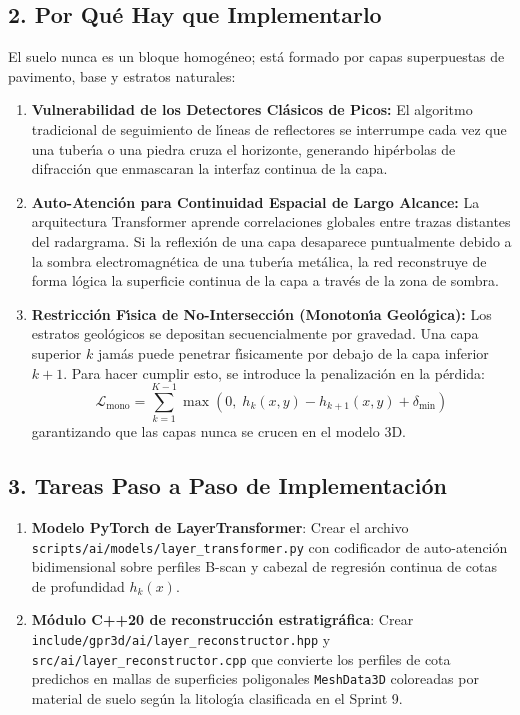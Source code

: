 \documentclass[11pt,a4paper]{article}
\begin{document}
\subsection{2. Por Qu{\'e} Hay que Implementarlo}
El suelo nunca es un bloque homog{\'e}neo; est{\'a} formado por capas superpuestas de pavimento, base y estratos naturales:
\begin{enumerate}
    \item \textbf{Vulnerabilidad de los Detectores Cl{\'a}sicos de Picos:} El algoritmo tradicional de seguimiento de l{\'\i}neas de reflectores se interrumpe cada vez que una tuber{\'\i}a o una piedra cruza el horizonte, generando hip{\'e}rbolas de difracci{\'o}n que enmascaran la interfaz continua de la capa.
    \item \textbf{Auto-Atenci{\'o}n para Continuidad Espacial de Largo Alcance:} La arquitectura Transformer aprende correlaciones globales entre trazas distantes del radargrama. Si la reflexi{\'o}n de una capa desaparece puntualmente debido a la sombra electromagn{\'e}tica de una tuber{\'\i}a met{\'a}lica, la red reconstruye de forma l{\'o}gica la superficie continua de la capa a trav{\'e}s de la zona de sombra.
    \item \textbf{Restricci{\'o}n F{\'\i}sica de No-Intersecci{\'o}n (Monoton{\'\i}a Geol{\'o}gica):} Los estratos geol{\'o}gicos se depositan secuencialmente por gravedad. Una capa superior $k$ jam{\'a}s puede penetrar f{\'\i}sicamente por debajo de la capa inferior $k+1$. Para hacer cumplir esto, se introduce la penalizaci{\'o}n en la p{\'e}rdida:
    \begin{equation}
        \mathcal{L}_{\text{mono}} = \sum_{k=1}^{K-1} \max\left(0, \; h_k(x, y) - h_{k+1}(x, y) + \delta_{\min}\right)
    \end{equation}
    garantizando que las capas nunca se crucen en el modelo 3D.
\end{enumerate}

\subsection{3. Tareas Paso a Paso de Implementaci{\'o}n}

\begin{enumerate}
    \item \textbf{Modelo PyTorch de LayerTransformer}:
    Crear el archivo \texttt{scripts/ai/models/layer\_transformer.py} con codificador de auto-atenci{\'o}n bidimensional sobre perfiles B-scan y cabezal de regresi{\'o}n continua de cotas de profundidad $h_k(x)$.

    \item \textbf{M{\'o}dulo C++20 de reconstrucci{\'o}n estratigr{\'a}fica}:
    Crear \texttt{include/gpr3d/ai/layer\_reconstructor.hpp} y \texttt{src/ai/layer\_reconstructor.cpp} que convierte los perfiles de cota predichos en mallas de superficies poligonales \texttt{MeshData3D} coloreadas por material de suelo seg{\'u}n la litolog{\'\i}a clasificada en el Sprint 9.
\end{enumerate}
\end{document}
